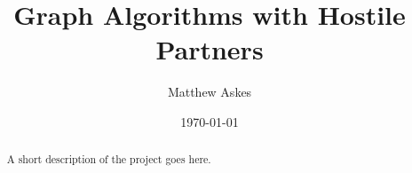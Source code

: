 \documentclass[11pt
              , a4paper
              , twoside
              , openright
              ]{book}
\title{Graph Algorithms with Hostile Partners}
\author{Matthew Askes}
\date{\today}
\theoremstyle{definition}
\begin{document}
\frontmatter

\begin{abstract}

A short description of the project goes here.

\end{abstract}

\maketitle

%
\tableofcontents

\listoffigures


\mainmatter








\backmatter


\end{document}
